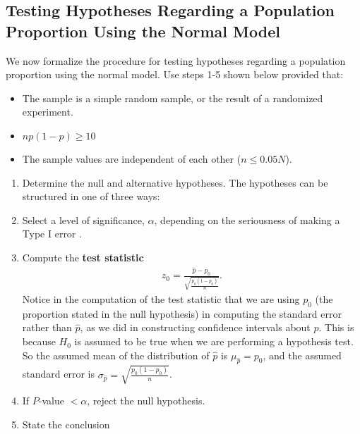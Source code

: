 \documentclass{report}
\begin{document}
    \subsection*{Testing Hypotheses Regarding a Population Proportion Using the Normal Model }
    \bigbreak \noindent 
        \bigbreak \noindent 
    We now formalize the procedure for testing hypotheses regarding a population proportion using the normal model. 
    \bigbreak \noindent 
    Use steps 1-5 shown below provided that:
    \begin{itemize}
        \item The sample is a simple random sample, or the result of a randomized experiment.
        \item $np(1-p) \geq 10$
        \item The sample values are independent of each other ($n \leq 0.05N$).
    \end{itemize}
    \bigbreak \noindent 
    \begin{enumerate}
        \item Determine the null and alternative hypotheses. The hypotheses can be structured in one of three ways:
        \item Select a level of significance, $\alpha$, depending on the seriousness of making a Type I error .
        \item Compute the \textbf{test statistic}
            \begin{align*}
                z_{0} = \frac{\hat{p}-p_{0}}{\sqrt{\frac{p_{0}(1-p_{0})}{n}}}
            .\end{align*}
         Notice in the computation of the test statistic that we are using $p_0$ (the proportion stated in the null hypothesis) in computing the standard error rather than $\hat{p}$, as we did in constructing confidence intervals about $p$. This is because $H_0$ is assumed to be true when we are performing a hypothesis test. So the assumed mean of the distribution of $\hat{p}$ is $\mu_{\hat{p}}=p_0$, and the assumed standard error is $\sigma_{\hat{p}}= \sqrt{\frac{p_0(1-p_0)}{n}}$.
     \item If $P$-value $< \alpha$, reject the null hypothesis.
    \item State the conclusion
    \end{enumerate}
    
\end{document}
